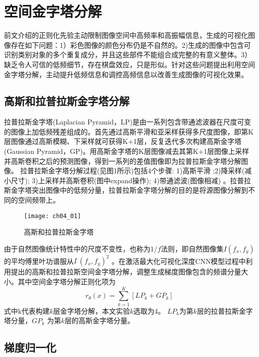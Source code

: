  
 
\section{空间金字塔分解}
 
前文介绍的正则化先验主动限制图像空间中高频率和高振幅信息，生成的可视化图像存在如下问题：1）彩色图像的颜色分布仍是不自然的。2)生成的图像中包含可识别类别对象的多个重复成分，并且这些部件不能组合成完整的有意义整体。3）缺乏令人可信的低频细节，存在棋盘效应，只是形似。针对这些问题提出利用空间金字塔分解，主动提升低频信息和调控高频信息以改善生成图像的可视化效果。

\subsection{高斯和拉普拉斯金字塔分解}
 
拉普拉斯金字塔(Laplacian Pyramid，LP)\citep{Burt1983}是由一系列包含带通滤波器在尺度可变的图像上加低频残差组成的。首先通过高斯平滑和亚采样获得多尺度图像，即第K层图像通过高斯模糊、下采样就可获得K+1层，反复迭代多次构建高斯金字塔(Gaussian Pyramid，GP)。用高斯金字塔的K层图像减去其第K+1层图像上采样并高斯卷积之后的预测图像，得到一系列的差值图像即为拉普拉斯金字塔分解图像。
拉普拉斯金字塔分解过程(见图1所示)包括4个步骤: 1)高斯平滑 ;2)降采样(减小尺寸); 3)上采样并高斯卷积(图中expand操作); 4)带通滤波(图像相减)  。拉普拉斯金字塔突出图像中的低频分量，拉普拉斯金字塔分解的目的是将源图像分解到不同的空间频带上。
\begin{figure}[!htbp]
\centering
\texttt{[image: ch04\_01]}
\caption{高斯和拉普拉斯金字塔}
\label{fig:ch04_01}
\end{figure}

	由于自然图像统计特性中的尺度不变性，也称为$1/f$法则\citep{VanderSchaaf1996a}，即自然图像集$I(f_{x},f_{y})$ 的平均傅里叶功谱服从$I~(f_{x},f_{y})^2$ 。在激活最大化可视化深度CNN模型过程中利用提出的高斯和拉普拉斯空间金字塔分解，调整生成梯度图像包含的频谱分量大小。其中空间金字塔分解正则化项为
\begin{equation} \label{eq:ch04_08}
       r_{\theta}(x)= \sum_{k=1}^{K}[LP_{k}+GP_{k}]
\end{equation}
式中k代表构建$k$层金字塔分解，本文实验$k$选取为4。 $LP_{k}$为第$k$层的拉普拉斯金字塔分量，$GP_{k}$ 为第$k$层的高斯金字塔分量。 


\subsection{梯度归一化}
  
